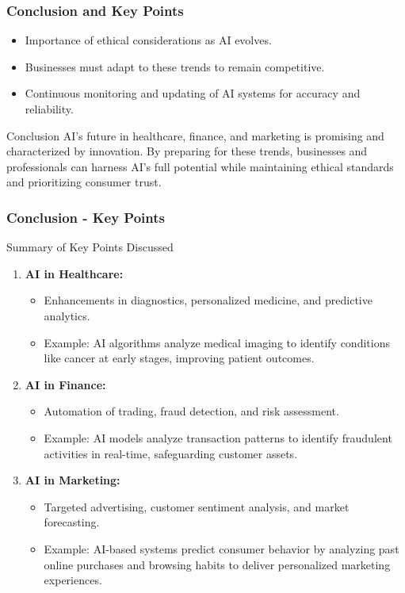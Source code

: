 \documentclass{beamer}
\begin{document}
\begin{frame}[fragile]
    \frametitle{Conclusion and Key Points}
    
    \begin{itemize}
        \item Importance of ethical considerations as AI evolves.
        \item Businesses must adapt to these trends to remain competitive.
        \item Continuous monitoring and updating of AI systems for accuracy and reliability.
    \end{itemize}
    
    \begin{block}{Conclusion}
        AI's future in healthcare, finance, and marketing is promising and characterized by innovation. By preparing for these trends, businesses and professionals can harness AI's full potential while maintaining ethical standards and prioritizing consumer trust.
    \end{block}
\end{frame}

\begin{frame}[fragile]
    \frametitle{Conclusion - Key Points}
    \begin{block}{Summary of Key Points Discussed}
        \begin{enumerate}
            \item \textbf{AI in Healthcare:}
            \begin{itemize}
                \item Enhancements in diagnostics, personalized medicine, and predictive analytics.
                \item Example: AI algorithms analyze medical imaging to identify conditions like cancer at early stages, improving patient outcomes.
            \end{itemize}

            \item \textbf{AI in Finance:}
            \begin{itemize}
                \item Automation of trading, fraud detection, and risk assessment.
                \item Example: AI models analyze transaction patterns to identify fraudulent activities in real-time, safeguarding customer assets.
            \end{itemize}

            \item \textbf{AI in Marketing:}
            \begin{itemize}
                \item Targeted advertising, customer sentiment analysis, and market forecasting.
                \item Example: AI-based systems predict consumer behavior by analyzing past online purchases and browsing habits to deliver personalized marketing experiences.
            \end{itemize}
        \end{enumerate}
    \end{block}
\end{frame}
\end{document}
